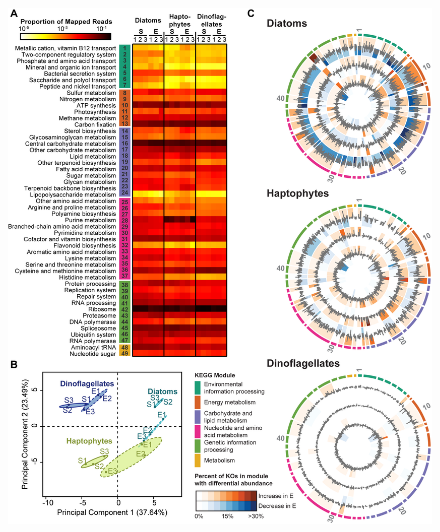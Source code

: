 \begin{figure}[p!]
  \centering
    \includegraphics[width=1\textwidth]{Images/C4_Figure2_Final.png}

\end{figure}
